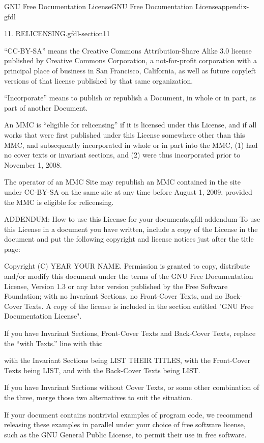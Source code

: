 \documentclass[oneside,10pt,]{book}
\numberwithin{equation}{section}
\begin{document}
\begin{appendixptx}{GNU Free Documentation License}{}{GNU Free Documentation License}{}{}{appendix-gfdl}
\begin{paragraphs}{11. RELICENSING.}{gfdl-section11}
\par
\hypertarget{p-1614}{}%
``CC-BY-SA'' means the Creative Commons Attribution-Share Alike 3.0 license published by Creative Commons Corporation, a not-for-profit corporation with a principal place of business in San Francisco, California, as well as future copyleft versions of that license published by that same organization.%
\par
\hypertarget{p-1615}{}%
``Incorporate'' means to publish or republish a Document, in whole or in part, as part of another Document.%
\par
\hypertarget{p-1616}{}%
An MMC is ``eligible for relicensing'' if it is licensed under this License, and if all works that were first published under this License somewhere other than this MMC, and subsequently incorporated in whole or in part into the MMC, (1) had no cover texts or invariant sections, and (2) were thus incorporated prior to November 1, 2008.%
\par
\hypertarget{p-1617}{}%
The operator of an MMC Site may republish an MMC contained in the site under CC-BY-SA on the same site at any time before August 1, 2009, provided the MMC is eligible for relicensing.%
\end{paragraphs}%
\begin{paragraphs}{ADDENDUM: How to use this License for your documents.}{gfdl-addendum}%
\hypertarget{p-1618}{}%
To use this License in a document you have written, include a copy of the License in the document and put the following copyright and license notices just after the title page:%
\begin{preformatted}
Copyright (C)  YEAR  YOUR NAME.
Permission is granted to copy, distribute and/or modify this document
under the terms of the GNU Free Documentation License, Version 1.3
or any later version published by the Free Software Foundation;
with no Invariant Sections, no Front-Cover Texts, and no Back-Cover Texts.
A copy of the license is included in the section entitled "GNU
Free Documentation License".
\end{preformatted}
\hypertarget{p-1619}{}%
If you have Invariant Sections, Front-Cover Texts and Back-Cover Texts, replace the ``with\textellipsis{} Texts.'' line with this:%
\begin{preformatted}
with the Invariant Sections being LIST THEIR TITLES, with the
Front-Cover Texts being LIST, and with the Back-Cover Texts being LIST.
\end{preformatted}
\hypertarget{p-1620}{}%
If you have Invariant Sections without Cover Texts, or some other combination of the three, merge those two alternatives to suit the situation.%
\par
\hypertarget{p-1621}{}%
If your document contains nontrivial examples of program code, we recommend releasing these examples in parallel under your choice of free software license, such as the GNU General Public License, to permit their use in free software.%
\end{paragraphs}%
\end{appendixptx}
\end{document}
